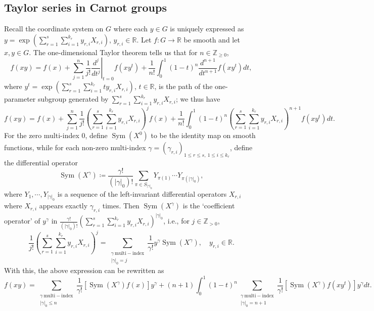 \documentclass[11pt,reqno]{amsart}
\newcommand{\1}{\mathbf 1}
\begin{document}
\subsection{Taylor series in Carnot groups}\label{subsec:taylor}
Recall the coordinate system on $G$ where each $y\in G$ is uniquely expressed as $y=\exp\left(\sum_{r=1}^s\sum_{i=1}^{k_r}y_{r,i}X_{r,i}\right)$, $y_{r,i}\in \mathbb{R}$. Let $f:G\to \mathbb{R}$ be smooth and let $x,y\in G$. The one-dimensional Taylor theorem tells us that for $n\in \mathbb{Z}_{\ge 0}$,
\[
f\left(xy\right)=f\left(x\right)+\sum_{j=1}^n \frac{1}{j!}\left.\frac{d^j}{dt^j}\right|_{t=0}f\left(xy^t\right)+\frac{1}{n!}\int_0^1\left(1-t\right)^n\frac{d^{n+1}}{dt^{n+1}}f\left(xy^t\right)dt,
\]
where $y^t=\exp\left(\sum_{r=1}^s\sum_{i=1}^{k_r}ty_{r,i}X_{r,i}\right)$, $t\in \mathbb{R}$, is the path of the one-parameter subgroup generated by $\sum_{r=1}^s\sum_{i=1}^{k_r}y_{r,i}X_{r,i}$; we thus have
\[
f\left(xy\right)=f\left(x\right)+\sum_{j=1}^n \frac{1}{j!}\left(\sum_{r=1}^s\sum_{i=1}^{k_r}y_{r,i}X_{r,i}\right)^jf\left(x\right)+\frac{1}{n!}\int_0^1\left(1-t\right)^n\left(\sum_{r=1}^s\sum_{i=1}^{k_r}y_{r,i}X_{r,i}\right)^{n+1}f\left(xy^t\right)dt.
\]
For the zero multi-index $0$, define $\operatorname{Sym}\left(X^0\right)$ to be the identity map on smooth functions, while for each non-zero multi-index $\gamma=\left(\gamma_{r,i}\right)_{1\le r\le s,~1\le i\le k_r}$, define the differential operator
\begin{equation}\label{eq:sym}
    \operatorname{Sym}\left(X^\gamma\right)\coloneqq\frac{\gamma!}{\left(\left|\gamma\right|_0\right)!}\sum_{\pi\in S_{\left|\gamma\right|_0}}Y_{\pi\left(1\right)}\cdots Y_{\pi\left(\left|\gamma\right|_0\right)},
\end{equation}
where $Y_1,\cdots,Y_{\left|\gamma\right|_0}$ is a sequence of the left-invariant differential operators $X_{r,i}$ where $X_{r,i}$ appears exactly $\gamma_{r,i}$ times. Then $\operatorname{Sym}\left(X^\gamma\right)$ is the `coefficient operator' of $y^\gamma$ in $\frac{\gamma!}{\left(\left|\gamma\right|_0\right)!}\left(\sum_{r=1}^s\sum_{i=1}^{k_r}y_{r,i}X_{r,i}\right)^{\left|\gamma\right|_0}$, i.e., for $j\in \mathbb{Z}_{>0}$,
\[
\frac{1}{j!}\left(\sum_{r=1}^s\sum_{i=1}^{k_r}y_{r,i}X_{r,i}\right)^j=\sum_{\substack{\gamma\mathrm{~multi-index}\\ \left|\gamma\right|_0=j}}\frac{1}{\gamma !}y^\gamma\operatorname{Sym}\left(X^\gamma\right),\quad y_{r,i}\in \mathbb{R}.
\]
With this, the above expression can be rewritten as
\begin{equation}\label{eq:Taylor_integral}
f\left(xy\right)=\sum_{\substack{\gamma\mathrm{~multi-index}\\ \left|\gamma\right|_0\le n}}\frac{1}{\gamma !}\left[\operatorname{Sym}\left(X^\gamma\right)f\left(x\right)\right]y^\gamma +\left(n+1\right)\int_0^1\left(1-t\right)^n \sum_{\substack{\gamma\mathrm{~multi-index}\\ \left|\gamma\right|_0=n+1}}\frac{1}{\gamma !}\left[\operatorname{Sym}\left(X^\gamma\right)f\left(xy^t\right)\right]y^\gamma dt.
\end{equation}
\end{document}
